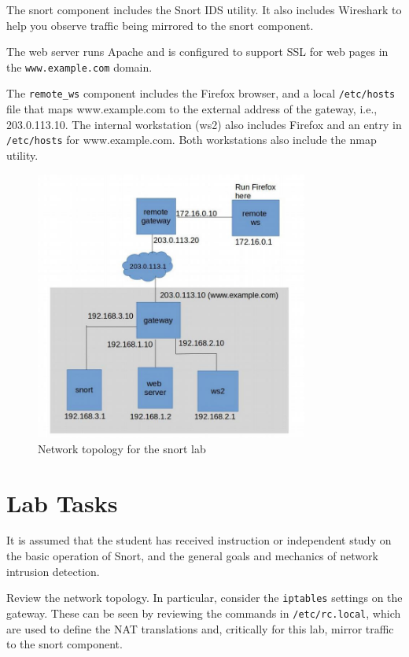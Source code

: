 The snort component includes the Snort IDS utility.  It also includes Wireshark
to help you observe traffic being mirrored to the snort component.

The web server runs Apache and is configured to support SSL for web pages in the
{\tt www.example.com} domain.

The {\tt remote\_ws} component includes the Firefox browser, and a local 
{\tt /etc/hosts} file that maps www.example.com to the external address of the
gateway, i.e., 203.0.113.10.  The internal workstation (ws2) also includes Firefox
and an entry in {\tt /etc/hosts} for www.example.com.  Both workstations also
include the nmap utility.


\begin{figure}[H]
\begin{center}
\includegraphics [width=0.8\textwidth]{snort.jpg}
\end{center}
\caption{Network topology for the snort lab}
\label{fig:topology}
\end{figure}

\section{Lab Tasks}
It is assumed that the student has received instruction or independent study on
the basic operation of Snort, and the general goals and mechanics of network intrusion detection.

Review the network topology.  In particular, consider the {\tt iptables} settings on the gateway.
These can be seen by reviewing the commands in {\tt /etc/rc.local}, which are used to
define the NAT translations and, critically for this lab, mirror traffic to the snort component. 

